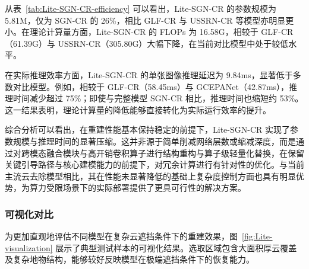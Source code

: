 从表~\ref{tab:Lite-SGN-CR-efficiency} 可以看出，Lite-SGN-CR 的参数规模为 5.81M，仅为 SGN-CR 的 26\%，相比 GLF-CR 与 USSRN-CR 等模型亦明显更小。在理论计算量方面，Lite-SGN-CR 的 FLOPs 为 16.58G，相较于 GLF-CR（61.39G）与 USSRN-CR（305.80G）大幅下降，在当前对比模型中处于较低水平。

在实际推理效率方面，Lite-SGN-CR 的单张图像推理延迟为 9.84ms，显著低于多数对比模型。例如，相较于 GLF-CR（58.45ms）与 GCEPANet（42.87ms），推理时间减少超过 75\%；即使与完整模型 SGN-CR 相比，推理时间也缩短约 53\%。这一结果表明，理论计算量的降低能够直接转化为实际运行效率的提升。

综合分析可以看出，在重建性能基本保持稳定的前提下，Lite-SGN-CR 实现了参数规模与推理时间的显著压缩。这并非源于简单削减网络层数或缩减深度，而是通过对跨模态融合模块与高开销卷积算子进行结构重构与算子级轻量化替换，在保留关键引导路径与核心建模能力的前提下，对冗余计算进行有针对性的优化。与当前主流云去除模型相比，其在性能未显著降低的基础上复杂度控制方面也具有明显优势，为算力受限场景下的实际部署提供了更具可行性的解决方案。

\subsubsection{可视化对比}

为更加直观地评估不同模型在复杂云遮挡条件下的重建效果，图~\ref{fig:Lite-visualization} 展示了典型测试样本的可视化结果。选取区域包含大面积厚云覆盖及复杂地物结构，能够较好反映模型在极端遮挡条件下的恢复能力。

